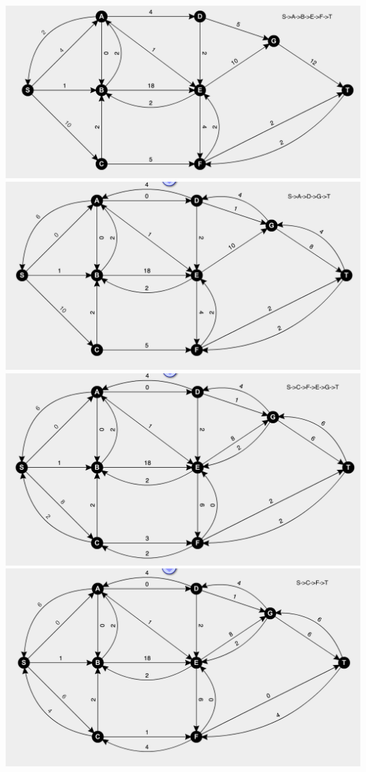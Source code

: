 \documentclass[11pt]{article}
\begin{document}
\begin{enumerate}
\begin{center}
\includegraphics[scale=.4]{1st}
\includegraphics[scale=.4]{2nd}
\includegraphics[scale=.4]{3rd}
\includegraphics[scale=.4]{4th}

\end{center}
\end{enumerate}
\end{document}

